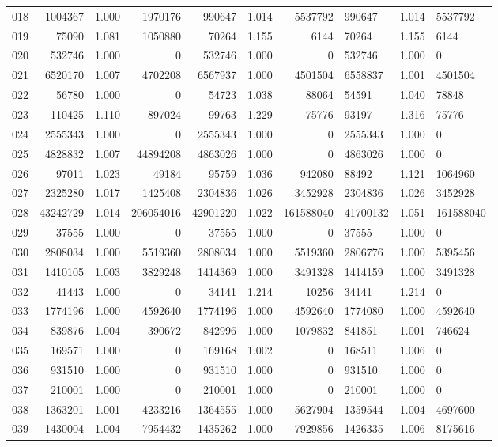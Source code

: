 \begin{longtable}{crrrrrr}
018 & 1004367 & 1.000 & 1970176 & 990647 & 1.014 & 5537792 & 990647 & 1.014 & 5537792 \\
019 & 75090 & 1.081 & 1050880 & 70264 & 1.155 & 6144 & 70264 & 1.155 & 6144 \\
020 & 532746 & 1.000 & 0 & 532746 & 1.000 & 0 & 532746 & 1.000 & 0 \\
021 & 6520170 & 1.007 & 4702208 & 6567937 & 1.000 & 4501504 & 6558837 & 1.001 & 4501504 \\
022 & 56780 & 1.000 & 0 & 54723 & 1.038 & 88064 & 54591 & 1.040 & 78848 \\
023 & 110425 & 1.110 & 897024 & 99763 & 1.229 & 75776 & 93197 & 1.316 & 75776 \\
024 & 2555343 & 1.000 & 0 & 2555343 & 1.000 & 0 & 2555343 & 1.000 & 0 \\
025 & 4828832 & 1.007 & 44894208 & 4863026 & 1.000 & 0 & 4863026 & 1.000 & 0 \\
026 & 97011 & 1.023 & 49184 & 95759 & 1.036 & 942080 & 88492 & 1.121 & 1064960 \\
027 & 2325280 & 1.017 & 1425408 & 2304836 & 1.026 & 3452928 & 2304836 & 1.026 & 3452928 \\
028 & 43242729 & 1.014 & 206054016 & 42901220 & 1.022 & 161588040 & 41700132 & 1.051 & 161588040 \\
029 & 37555 & 1.000 & 0 & 37555 & 1.000 & 0 & 37555 & 1.000 & 0 \\
030 & 2808034 & 1.000 & 5519360 & 2808034 & 1.000 & 5519360 & 2806776 & 1.000 & 5395456 \\
031 & 1410105 & 1.003 & 3829248 & 1414369 & 1.000 & 3491328 & 1414159 & 1.000 & 3491328 \\
032 & 41443 & 1.000 & 0 & 34141 & 1.214 & 10256 & 34141 & 1.214 & 0 \\
033 & 1774196 & 1.000 & 4592640 & 1774196 & 1.000 & 4592640 & 1774080 & 1.000 & 4592640 \\
034 & 839876 & 1.004 & 390672 & 842996 & 1.000 & 1079832 & 841851 & 1.001 & 746624 \\
035 & 169571 & 1.000 & 0 & 169168 & 1.002 & 0 & 168511 & 1.006 & 0 \\
036 & 931510 & 1.000 & 0 & 931510 & 1.000 & 0 & 931510 & 1.000 & 0 \\
037 & 210001 & 1.000 & 0 & 210001 & 1.000 & 0 & 210001 & 1.000 & 0 \\
038 & 1363201 & 1.001 & 4233216 & 1364555 & 1.000 & 5627904 & 1359544 & 1.004 & 4697600 \\
039 & 1430004 & 1.004 & 7954432 & 1435262 & 1.000 & 7929856 & 1426335 & 1.006 & 8175616 \\

\end{longtable}
